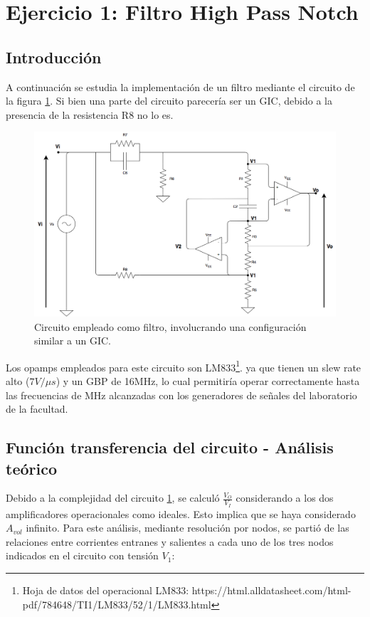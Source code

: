 
\section{Ejercicio 1: Filtro High Pass Notch}

\subsection{Introducci\'on}

A continuaci\'on se estudia la implementaci\'on de un filtro mediante el circuito de la figura \ref{circ1}. Si bien una parte del circuito parecer\'ia ser un GIC, debido a la presencia de la resistencia R8 no lo es.

\begin{figure}[H] %
	\centering
	\includegraphics[scale=0.4]{../EJ1/circuito1.png}
	\caption{Circuito empleado como filtro, involucrando una configuraci\'on similar a un GIC.}
	\label{circ1}
\end{figure}

Los opamps empleados para este circuito son LM833\footnote{Hoja de datos del operacional LM833: https://html.alldatasheet.com/html-pdf/784648/TI1/LM833/52/1/LM833.html}. ya que tienen un slew rate alto ($7V/\mu s$) y un GBP de 16MHz, lo cual permitir\'ia operar correctamente hasta las frecuencias de MHz alcanzadas con los generadores de se\~nales del laboratorio de la facultad.

\subsection{Funci\'on transferencia del circuito - An\'alisis te\'orico}
Debido a la complejidad del circuito \ref{circ1}, se  calcul\'o $\frac{V_O}{V_I}$ considerando a los dos amplificadores operacionales como ideales. Esto implica que se haya considerado $A_{vol}$ infinito. Para este an\'alisis, mediante resoluci\'on por nodos, se parti\'o de las relaciones entre corrientes entranes y salientes a cada uno de los tres nodos indicados en el circuito con tensi\'on $V_1$:


